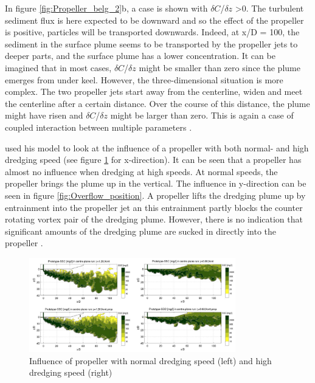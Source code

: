 \noindent In figure \ref{fig:Propeller_belg_2}b, a case is shown with $\delta C$/$\delta z$ >0. The turbulent sediment flux is here expected to be downward and so the effect of the propeller is positive, particles will be transported downwards. Indeed, at x/D = 100, the sediment in the surface plume seems to be transported by the propeller jets to deeper parts, and the surface plume has a lower concentration. \newline 
\noindent It can be imagined that in most cases, $\delta C$/$\delta z$ might be smaller than zero since the plume emerges from under keel. However, the three-dimensional situation is more complex. The two propeller jets start away from the centerline, widen and meet the centerline after a certain distance. Over the course of this distance, the plume might have risen and $\delta C$/$\delta z$ might be larger than zero. This is again a case of coupled interaction between multiple parameters \citep{Decrop}. \newline

\noindent \cite{Dewit} used his model to look at the influence of a propeller with both normal- and high dredging speed (see figure \ref{fig:Propeller_dewit} for x-direction). It can be seen that a propeller has almost no influence when dredging at high speeds. At normal speeds, the propeller brings the plume up in the vertical. The influence in y-direction can be seen in figure \ref{fig:Overflow_position}. A propeller lifts the dredging plume up by entrainment into the propeller jet an this entrainment partly blocks the counter rotating vortex pair of the dredging plume. However, there is no indication that significant amounts of the dredging plume are sucked in directly into the propeller \citep{Dewit}.

\begin{figure}[ht!]
    \centering
    \includegraphics[width = 0.8\textwidth]{Images/Propeller_dewit.png}
    \caption{Influence of propeller with normal dredging speed (left) and high dredging speed (right)}
    \label{fig:Propeller_dewit}
\end{figure}

